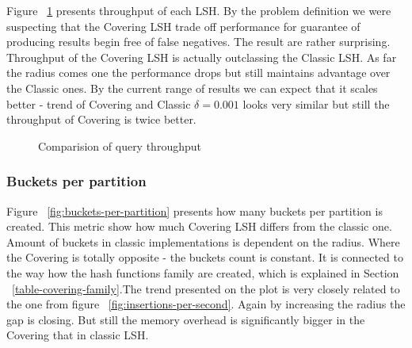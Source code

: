 Figure ~\ref{fig:queries-per-second} presents throughput of each LSH. By the problem definition we were suspecting that the Covering LSH trade off performance for guarantee of producing results begin free of false negatives. The result are rather surprising. Throughput of the Covering LSH is actually outclassing the Classic LSH. As far the radius comes one the performance drops but still maintains advantage over the Classic ones. By the current range of results we can expect that it scales better - trend of Covering and Classic $\delta = 0.001$ looks very similar but still the throughput of Covering is twice better.

\begin{figure}[ht]

  \caption{Comparision of query throughput}
  \label{fig:queries-per-second}
\end{figure}

\subsubsection{Buckets per partition}

Figure ~\ref{fig:buckets-per-partition} presents how many buckets per partition
is created. This metric show how much Covering LSH differs from the classic one.
Amount of buckets in classic implementations is dependent on the radius. Where
the Covering is totally opposite - the buckets count is constant. It is
connected to the way how the hash functions family are created, which is
explained in Section ~\ref{table-covering-family}.The trend presented on the
plot is very closely related  to the one from figure ~\ref{fig:insertions-per-second}. Again by increasing the radius the gap is closing. But still the memory overhead is significantly bigger in the Covering that in classic LSH.

